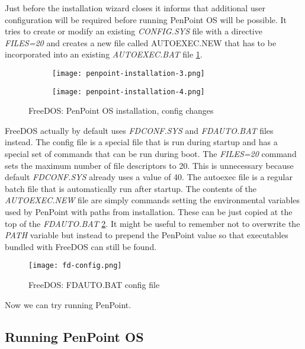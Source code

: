 Just before the installation wizard closes it informs that additional user
configuration will be required before running PenPoint OS will be possible. It
tries to create or modify an existing \emph{CONFIG.SYS} file with a directive
\emph{FILES=20} and creates a new file called AUTOEXEC.NEW that has to be
incorporated into an existing \emph{AUTOEXEC.BAT} file
\ref{fig:penpoint-installation-2}.

\begin{figure}[H]
    \centering
    \begin{subfigure}[b]{0.45\linewidth}
        \texttt{[image: penpoint-installation-3.png]}
    \end{subfigure}
    \hfill
    \begin{subfigure}[b]{0.45\linewidth}
        \texttt{[image: penpoint-installation-4.png]}
    \end{subfigure}
    \caption{FreeDOS: PenPoint OS installation, config changes}
    \label{fig:penpoint-installation-2}
\end{figure}

FreeDOS actually by default uses \emph{FDCONF.SYS} and \emph{FDAUTO.BAT} files
instead. The config file is a special file that is run during startup and has
a special set of commands that can be run during boot. The \emph{FILES=20}
command sets the maximum number of file descriptors to 20. This is unnecessary
because default \emph{FDCONF.SYS} already uses a value of 40. The autoexec file
is a regular batch file that is automatically run after startup. The contents
of the \emph{AUTOEXEC.NEW} file are simply commands setting the environmental
variables used by PenPoint with paths from installation. These can be just
copied at the top of the \emph{FDAUTO.BAT} \ref{fig:fd-config}. It might be
useful to remember not to overwrite the \emph{PATH} variable but instead to
prepend the PenPoint value so that executables bundled with FreeDOS can still
be found.

\begin{figure}[H]
    \centering
    \texttt{[image: fd-config.png]}
    \caption{FreeDOS: FDAUTO.BAT config file}
    \label{fig:fd-config}
\end{figure}

Now we can try running PenPoint.

\subsection{Running PenPoint OS}

